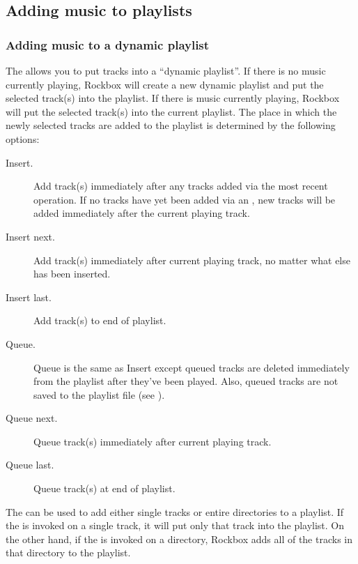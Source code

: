 \subsection{Adding music to playlists}
  
\subsubsection{\label{ref:playlist_submenu}Adding music to a dynamic playlist}
The  allows you to put tracks into a
``dynamic playlist''. If there is no music currently playing, Rockbox will
create a new dynamic playlist and put the selected track(s) into the
playlist. If there is music currently playing, Rockbox will put the
selected track(s) into the current playlist. The place in which the newly
selected tracks are added to the playlist is determined by the following
options:

\begin{description} 
\item [Insert.] Add track(s) immediately after any tracks added via the most
  recent  operation. If no tracks have yet been added via an
  , new tracks will be added immediately after the current
  playing track.
  
\item [Insert next.] Add track(s) immediately after current playing
  track, no matter what else has been inserted.
  
\item [Insert last.] Add track(s) to end of playlist.
  
\item [Queue.] Queue is the same as Insert except queued tracks are
  deleted immediately from the playlist after they've been played. Also,
  queued tracks are not saved to the playlist file (see
  ).
  
\item [Queue next.] Queue track(s) immediately after current playing track.
  
\item [Queue last.] Queue track(s) at end of playlist.
\end{description}

The   can be used to add either single tracks or
entire directories to a playlist. If the  is
invoked on a single track, it will put only that track into the playlist.
On the other hand, if the  is invoked on a
directory, Rockbox adds all of the tracks in that directory to the
playlist.

